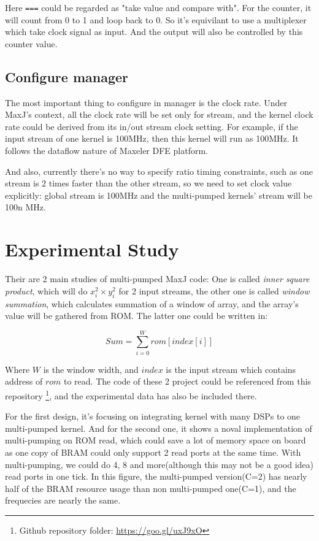 \documentclass[a4paper, 10pt]{report}
\begin{document}
Here \texttt{===} could be regarded as "take value and compare with". For the counter, it will count from 0 to 1 and loop back to 0. So it's equivilant to use a multiplexer which take clock signal as input. And the output will also be controlled by this counter value.

\subsection{Configure manager}
The most important thing to configure in manager is the clock rate. Under MaxJ's context, all the clock rate will be set only for stream, and the kernel clock rate could be derived from its in/out stream clock setting. For example, if the input stream of one kernel is 100MHz, then this kernel will run as 100MHz. It follows the dataflow nature of Maxeler DFE platform.

And also, currently there's no way to specify ratio timing constraints, such as one stream is 2 times faster than the other stream, so we need to set clock value explicitly: global stream is 100MHz and the multi-pumped kernels' stream will be 100n MHz.

\section{Experimental Study}
Their are 2 main studies of multi-pumped MaxJ code: One is called \textit{inner square product}, which will do $x_i^2 \times y_i^2$ for 2 input streams, the other one is called \textit{window summation}, which calculates summation of a window of array, and the array's value will be gathered from ROM. The latter one could be written in:

$$Sum = \sum_{i=0}^W rom[index[i]] $$

Where $W$ is the window width, and $index$ is the input stream which contains address of $rom$ to read. The code of these 2 project could be referenced from this repository \footnote{Github repository folder: \url{https://goo.gl/uxJ9xO}}, and the experimental data has also be included there.

For the first design, it's focusing on integrating kernel with many DSPs to one multi-pumped kernel. And for the second one, it shows a noval implementation of multi-pumping on ROM read, which could save a lot of memory space on board as one copy of BRAM could only support 2 read ports at the same time. With multi-pumping, we could do 4, 8 and more(although this may not be a good idea) read ports in one tick. In this figure, the multi-pumped version(C=2) has nearly half of the BRAM resource usage than non multi-pumped one(C=1), and the frequecies are nearly the same.
\end{document}
